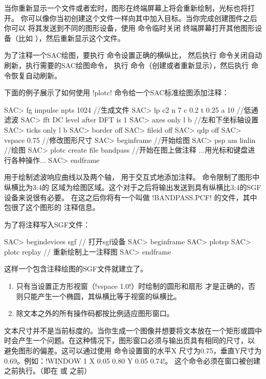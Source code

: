 当你重新显示一个文件或者宏时，图形在终端屏幕上将会重新绘制，光标也将打开。
你可以像你当初创建这个文件一样向其中加入目标。当你完成创建图件之后你可以
将其发送到不同的图形设备，使用  命令临时关闭
终端屏幕打开其他图形设备（比如 ），然后重新显示这个文件。

为了注释一个SAC绘图，要执行  命令设置正确的横纵比，
然后执行  命令关闭自动刷新，执行需要的SAC绘图命令，
执行  命令（创建或者重新显示），然后执行
 命令恢复自动刷新。

下面的例子展示了如何使用 !plotc! 命令给一个SAC标准绘图添加注释：
\begin{SACCode}
SAC> fg impulse npts 1024                      //生成文件
SAC> lp c2 n 7 c 0.2 t 0.25 a 10               //低通滤波
SAC> fft
 DC level after DFT is 1
SAC> axes only l b                             //左和下坐标轴设置
SAC> ticks only l b
SAC> border off
SAC> fileid off
SAC> qdp off
SAC> vspace 0.75                              //修改图形尺寸
SAC> beginframe                               //开始绘图
SAC> psp am linlin                            //绘图
SAC> plotc create file bandpass               //开始在图上做注释
...用光标和键盘进行各种操作...
SAC> endframe
\end{SACCode}

 用于绘制滤波响应曲线以及两个轴，
用于交互式地添加注释。 命令限制了图形中纵横比为3:4的
区域为绘图区域。这个对于之后将输出发送到具有纵横比3:4的SGF设备来说很有必要。
在这之后你将有一个叫做 !BANDPASS.PCF! 的文件，其中包很了这个图形的
注释信息。

为了将注释写入SGF文件：
\begin{SACCode}
SAC> begindevices sgf                  // 打开sgf设备
SAC> beginframe
SAC> plotsp
SAC> plotc replay                      // 重新绘制上一注释图
SAC> endframe
\end{SACCode}
这样一个包含注释绘图的SGF文件就建立了。

\begin{enumerate}
    \item 只有当设置正方形视窗（!vspace 1.0!）时绘制的圆形和扇形
        才是正确的，否则只能产生一个椭圆，其纵横比等于视窗的纵横比。
\item 除文本之外的所有操作码都按比例适应图形窗口。
\end{enumerate}
文本尺寸并不是当前标度的。当你生成一个图像并想要将文本放在一个矩形或圆中
时会产生一个问题。在这种情况下，图形窗口必须与输出页具有相同的尺寸，以
避免图形的偏差。这可以通过使用  命令设置窗的水平X
尺寸为0.75，垂直Y尺寸为0.69。例如：!WINDOW 1 X 0.05 0.80 Y 0.05 0.74!。
这个命令必须在窗口被创建之前执行。（即在  或
 之前）

